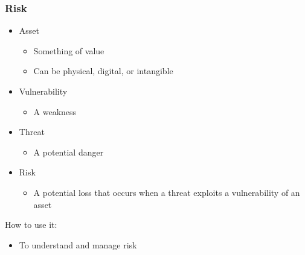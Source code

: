 \documentclass[blue]{beamer}
\begin{document}
\begin{frame}
\frametitle{Risk}

\begin{itemize}
  \item Asset
  \begin{itemize}
    \item Something of value
    \item Can be physical, digital, or intangible
  \end{itemize}
  \item Vulnerability
  \begin{itemize}
    \item A weakness
  \end{itemize}
  \item Threat
  \begin{itemize}
    \item A potential danger
  \end{itemize}
  \item Risk
  \begin{itemize}
    \item A potential loss that occurs when a threat exploits a vulnerability of an asset
  \end{itemize}
\end{itemize}

\begin{alertblock}{How to use it:}

\begin{itemize}
  \item To understand and manage risk
\end{itemize}
\end{alertblock}

\end{frame}
\end{document}
